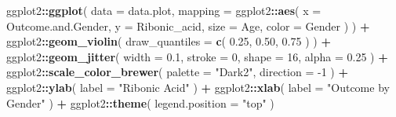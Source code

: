 \documentclass[]{article}
\newenvironment{Shaded}{\begin{snugshade}}{\end{snugshade}}
\newcommand{\DataTypeTok}[1]{\textcolor[rgb]{0.13,0.29,0.53}{#1}}
\newcommand{\DecValTok}[1]{\textcolor[rgb]{0.00,0.00,0.81}{#1}}
\newcommand{\FloatTok}[1]{\textcolor[rgb]{0.00,0.00,0.81}{#1}}
\newcommand{\KeywordTok}[1]{\textcolor[rgb]{0.13,0.29,0.53}{\textbf{#1}}}
\newcommand{\NormalTok}[1]{#1}
\newcommand{\OperatorTok}[1]{\textcolor[rgb]{0.81,0.36,0.00}{\textbf{#1}}}
\newcommand{\StringTok}[1]{\textcolor[rgb]{0.31,0.60,0.02}{#1}}
\begin{document}
\begin{Shaded}
\begin{Highlighting}[]
\NormalTok{ggplot2}\OperatorTok{::}\KeywordTok{ggplot}\NormalTok{(}
  \DataTypeTok{data =}\NormalTok{ data.plot,}
  \DataTypeTok{mapping =}
\NormalTok{    ggplot2}\OperatorTok{::}\KeywordTok{aes}\NormalTok{(}
      \DataTypeTok{x =}\NormalTok{ Outcome.and.Gender, }
      \DataTypeTok{y =}\NormalTok{ Ribonic_acid,}
      \DataTypeTok{size =}\NormalTok{ Age, }
      \DataTypeTok{color =}\NormalTok{ Gender}
\NormalTok{    )}
\NormalTok{) }\OperatorTok{+}
\StringTok{  }\NormalTok{ggplot2}\OperatorTok{::}\KeywordTok{geom_violin}\NormalTok{( }\DataTypeTok{draw_quantiles =} \KeywordTok{c}\NormalTok{( }\FloatTok{0.25}\NormalTok{, }\FloatTok{0.50}\NormalTok{, }\FloatTok{0.75}\NormalTok{ ) ) }\OperatorTok{+}\StringTok{ }
\StringTok{  }\NormalTok{ggplot2}\OperatorTok{::}\KeywordTok{geom_jitter}\NormalTok{(}
    \DataTypeTok{width =} \FloatTok{0.1}\NormalTok{,}
    \DataTypeTok{stroke =} \DecValTok{0}\NormalTok{,}
    \DataTypeTok{shape =} \DecValTok{16}\NormalTok{,}
    \DataTypeTok{alpha =} \FloatTok{0.25}
\NormalTok{  ) }\OperatorTok{+}
\StringTok{  }\NormalTok{ggplot2}\OperatorTok{::}\KeywordTok{scale_color_brewer}\NormalTok{( }\DataTypeTok{palette =} \StringTok{"Dark2"}\NormalTok{, }\DataTypeTok{direction =} \DecValTok{-1}\NormalTok{ ) }\OperatorTok{+}
\StringTok{  }\NormalTok{ggplot2}\OperatorTok{::}\KeywordTok{ylab}\NormalTok{( }\DataTypeTok{label =} \StringTok{"Ribonic Acid"}\NormalTok{ ) }\OperatorTok{+}
\StringTok{  }\NormalTok{ggplot2}\OperatorTok{::}\KeywordTok{xlab}\NormalTok{( }\DataTypeTok{label =} \StringTok{"Outcome by Gender"}\NormalTok{ ) }\OperatorTok{+}
\StringTok{  }\NormalTok{ggplot2}\OperatorTok{::}\KeywordTok{theme}\NormalTok{( }\DataTypeTok{legend.position =} \StringTok{"top"}\NormalTok{ )}
\end{Highlighting}
\end{Shaded}
\end{document}
